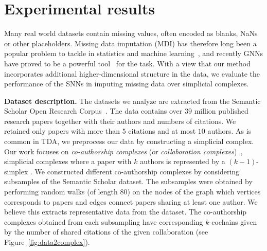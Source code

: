 \section{Experimental results}
Many real world datasets contain missing values, often encoded as blanks, NaNs or other placeholders. Missing data imputation (MDI) has therefore long been a popular problem to tackle in statistics and machine learning~\cite{little1986statistical, nelwamondo2007missing}, and recently GNNs have proved to be a powerful tool~\cite{spinelli2020neural} for the task. With a view that our method incorporates additional higher-dimensional structure in the data, we evaluate the performance of the SNNs in imputing missing data over simplicial complexes.

\textbf{Dataset description.} The datasets we analyze are extracted from the Semantic Scholar Open Research Corpus~\cite{ammar18NAACL}. The data contains over $39$ million published research papers together with their authors and numbers of citations. We retained only papers with more than $5$ citations and at most $10$ authors. As is common in TDA, we preprocess our data by constructing a simplicial complex. Our work focuses on \emph{co-authorship complexes} (or \emph{collaboration complexes})~\cite{patania2017}, simplicial complexes where a paper with $k$ authors is represented by a $(k-1)$-simplex . We constructed different co-authorship complexes by considering subsamples of the Semantic Scholar dataset. The subsamples were obtained by performing random walks (of length $80$) on the nodes of the graph which vertices corresponds to papers and edges connect papers sharing at least one author. We believe this extracts representative data from the dataset. The co-authorship complexes obtained from each subsampling have corresponding $k$-cochains given by the number of shared citations of the given collaboration (see Figure~\ref{fig:data2complex}).

